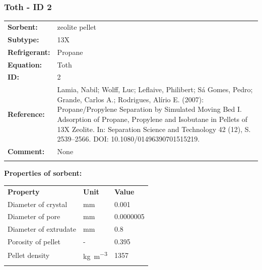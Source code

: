 \subsubsection{Toth - ID 2}
%
\begin{tabular}[l]{|lp{11.5cm}|}
\hline
\addlinespace

\textbf{Sorbent:} & zeolite pellet \\
\textbf{Subtype:} & 13X \\
\textbf{Refrigerant:} & Propane \\
\textbf{Equation:} & Toth \\
\textbf{ID:} & 2 \\
\textbf{Reference:} & Lamia, Nabil; Wolff, Luc; Leflaive, Philibert; Sá Gomes, Pedro; Grande, Carlos A.; Rodrigues, Alírio E. (2007): Propane/Propylene Separation by Simulated Moving Bed I. Adsorption of Propane, Propylene and Isobutane in Pellets of 13X Zeolite. In: Separation Science and Technology 42 (12), S. 2539–2566. DOI: 10.1080/01496390701515219. \\
\textbf{Comment:} & None \\

\addlinespace
\hline
\end{tabular}
\newline

\textbf{Properties of sorbent:}
\newline
%
\begin{longtable}[l]{lll}
\toprule
\addlinespace
\textbf{Property} & \textbf{Unit} & \textbf{Value} \\
\addlinespace
\midrule
\endhead
\bottomrule
\endfoot
\bottomrule
\endlastfoot
\addlinespace

Diameter of crystal & \si{\milli\meter} & 0.001\\
Diameter of pore & \si{\milli\meter} & 0.0000005\\
Diameter of extrudate & \si{\milli\meter} & 0.8\\
Porosity of pellet & - & 0.395\\
Pellet density & \si{\kilogram\per\cubic\meter} & 1357\\

\addlinespace\end{longtable}

